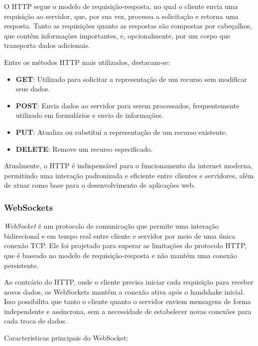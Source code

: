O HTTP segue o modelo de requisição-resposta, no qual o cliente envia uma requisição ao servidor, que, por sua vez, processa a solicitação e retorna uma resposta. Tanto as requisições quanto as respostas são compostas por cabeçalhos, que contêm informações importantes, e, opcionalmente, por um corpo que transporta dados adicionais.

Entre os métodos HTTP mais utilizados, destacam-se:

\begin{itemize}
    \item \textbf{GET}: Utilizado para solicitar a representação de um recurso sem modificar seus dados.
    \item \textbf{POST}: Envia dados ao servidor para serem processados, frequentemente utilizado em formulários e envio de informações.
    \item \textbf{PUT}: Atualiza ou substitui a representação de um recurso existente.
    \item \textbf{DELETE}: Remove um recurso especificado.
\end{itemize}

Atualmente, o HTTP é indispensável para o funcionamento da internet moderna, permitindo uma interação padronizada e eficiente entre clientes e servidores, além de atuar como base para o desenvolvimento de aplicações web.

\subsubsection{WebSockets}

\emph{WebSocket} é um protocolo de comunicação que permite uma interação bidirecional e em tempo real entre cliente e servidor por meio de uma única conexão TCP. Ele foi projetado para superar as limitações do protocolo HTTP, que é baseado no modelo de requisição-resposta e não mantém uma conexão persistente.\cite{ws-standard}

Ao contrário do HTTP, onde o cliente precisa iniciar cada requisição para receber novos dados, os WebSockets mantêm a conexão ativa após o handshake inicial. Isso possibilita que tanto o cliente quanto o servidor enviem mensagens de forma independente e assíncrona, sem a necessidade de estabelecer novas conexões para cada troca de dados. 

Características principais do WebSocket:

